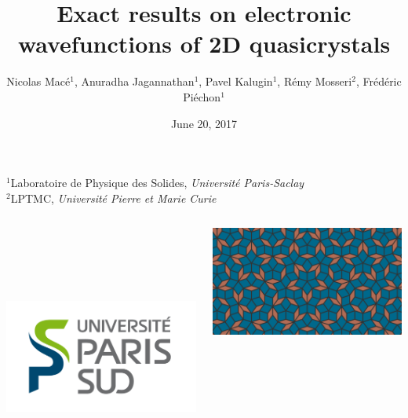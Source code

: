 \begin{frame}
\title{{\fontsize{14}{60}\selectfont Exact results on electronic wavefunctions of 2D quasicrystals}}

\author{{\fontsize{10}{60}\selectfont Nicolas Macé$^1$, Anuradha Jagannathan$^1$, Pavel Kalugin$^1$, Rémy Mosseri$^2$, Frédéric Piéchon$^1$}}

\institute %
{
  $^1$Laboratoire de Physique des Solides, \emph{Université Paris-Saclay} \\
  $^2$LPTMC, \emph{Université Pierre et Marie Curie}
}

\date{June 20, 2017}

\titlepage

\btVFill
\begin{columns}
\begin{column}{2cm}
~\\
~\\
~\\
~\\
\raggedright
\includegraphics[scale=.15]{img/0_cover/LogoUPSUD.png}
\end{column}
\begin{column}{6cm}
\centering
\includegraphics[width=.8\textwidth]{img/0_cover/cover.png}

\end{column}
\end{columns}
\end{frame}
